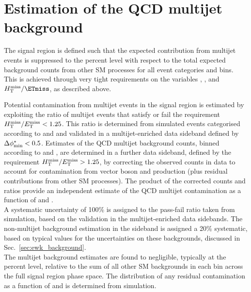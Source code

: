 \section{Estimation of the QCD multijet background}
\label{sec:qcd_background}

The signal region is defined such that the expected contribution from
multijet events is suppressed to the percent level with respect to the
total expected background counts from other SM processes for all event
categories and \scalht bins. This is achieved through very tight
requirements on the variables \alphat, \dphi, and $\mht / \ETmiss$, as
described above. 

Potential contamination from multijet events in the signal region is
estimated by exploiting the ratio of multijet events that satisfy or
fail the requirement $H_{\mathrm{T}}^{\text{miss}} / E_{\mathrm{T}}^{\text{miss}} < 1.25$. This ratio is determined from
simulated events categorised according to \njet and \scalht and
validated in a multijet-enriched data sideband defined by $\Delta\phi^{*}_{\rm min} <
0.5$. Estimates of the QCD multijet background counts, binned
according to \njet and \scalht, are determined in a further data
sideband, defined by the requirement $H_{\mathrm{T}}^{\text{miss}} / E_{\mathrm{T}}^{\text{miss}} > 1.25$, by correcting
the observed counts in data to account for contamination from vector
boson and \ttbar production (plus residual contributions from other SM
processes). The product of the corrected counts and ratios provide an
independent estimate of the QCD multijet contamination as a function
of \njet and \scalht. \\
A systematic uncertainty of 100\% is assigned to the pass-fail ratio taken from simulation, 
based on the validation in the \dphi multijet-enriched data sidebands. 
The non-multijet background estimation in the \mhtmet sideband is assigned 
a 20\% systematic, based on typical values for the uncertainties on these backgrounds, 
discussed in Sec.~\ref{sec:ewk_background}. \\
The multijet background estimates are found to negligible, typically at the percent level,
relative to the sum of all other SM backgrounds in each bin across the
full signal region phase space. The distribution of any residual
contamination as a function of \nb and \mht is determined from
simulation. 

